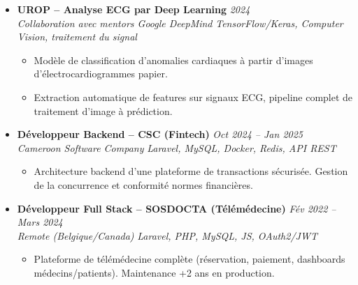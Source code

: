 \documentclass[a4paper,11pt]{article}
\begin{document}
\begin{itemize}[leftmargin=*, label={-}]
\item \textbf{UROP -- Analyse ECG par Deep Learning} \hfill \textit{2024} \\
\textit{Collaboration avec mentors Google DeepMind} \hfill \textit{TensorFlow/Keras, Computer Vision, traitement du signal}
\vspace{-2pt}
    \begin{itemize}[leftmargin=0.4cm, nosep, label=\tiny$\bullet$]
        \item \small{Modèle de classification d'anomalies cardiaques à partir d'images d'électrocardiogrammes papier.}
        \item \small{Extraction automatique de features sur signaux ECG, pipeline complet de traitement d'image à prédiction.}
    \end{itemize}
\vspace{3pt}

\item \textbf{Développeur Backend -- CSC (Fintech)} \hfill \textit{Oct 2024 -- Jan 2025} \\
\textit{Cameroon Software Company} \hfill \textit{Laravel, MySQL, Docker, Redis, API REST}
\vspace{-2pt}
    \begin{itemize}[leftmargin=0.4cm, nosep, label=\tiny$\bullet$]
        \item \small{Architecture backend d'une plateforme de transactions sécurisée. Gestion de la concurrence et conformité normes financières.}
    \end{itemize}
\vspace{3pt}

\item \textbf{Développeur Full Stack -- SOSDOCTA (Télémédecine)} \hfill \textit{Fév 2022 -- Mars 2024} \\
\textit{Remote (Belgique/Canada)} \hfill \textit{Laravel, PHP, MySQL, JS, OAuth2/JWT}
\vspace{-2pt}
    \begin{itemize}[leftmargin=0.4cm, nosep, label=\tiny$\bullet$]
        \item \small{Plateforme de télémédecine complète (réservation, paiement, dashboards médecins/patients). Maintenance +2 ans en production.}
    \end{itemize}
\vspace{3pt}

\end{itemize}

\end{document}
